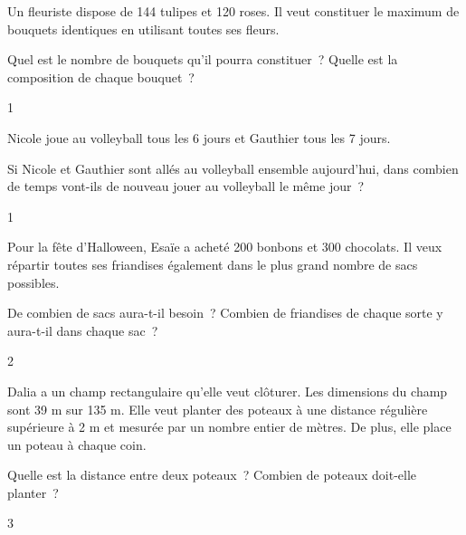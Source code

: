 \documentclass[a4paper,11pt]{report}
\begin{document}
\begin{exo}{ %
    Un fleuriste dispose de 144 tulipes et 120 roses. Il veut constituer le maximum de bouquets identiques en utilisant toutes ses fleurs.
    \begin{tasks}[label-width = 1em ,item-indent = 2em ,before-skip = -0.4em, after-skip = -0.4em , label-offset=0.666em,after-item-skip = 0.3em]
        \task Quel est le nombre de bouquets qu'il pourra constituer~?
        \task Quelle est la composition de chaque bouquet~?
    \end{tasks}
}{1}\end{exo}



\vfill


\begin{exo}{ %
    Nicole joue au volleyball tous les 6 jours et Gauthier tous les 7 jours. 

    Si Nicole et Gauthier sont allés au volleyball ensemble aujourd'hui, dans combien de temps vont-ils de nouveau jouer au volleyball le même jour~? 
}{1}\end{exo}

\vfill


\begin{exo}{ %
    Pour la fête d'Halloween, Esaïe a acheté 200 bonbons et 300 chocolats. Il veux répartir toutes ses friandises également dans le plus grand nombre de sacs possibles.
    \begin{tasks}[label-width = 1em ,item-indent = 2em ,before-skip = -0.4em, after-skip = -0.4em , label-offset=0.666em,after-item-skip = 0.3em]
        \task De combien de sacs aura-t-il besoin~?
        \task Combien de friandises de chaque sorte y aura-t-il dans chaque sac~?
    \end{tasks}
}{2}\end{exo}


\vfill
\begin{exo}{ %
    Dalia a un champ rectangulaire qu'elle veut clôturer. Les dimensions du champ sont 39 m sur 135 m. Elle veut planter des poteaux à une distance régulière supérieure à 2 m et mesurée par un nombre entier de mètres. De plus, elle place un poteau à chaque coin.
    \begin{tasks}[label-width = 1em ,item-indent = 2em ,before-skip = -0.4em, after-skip = -0.4em , label-offset=0.666em,after-item-skip = 0.3em]
        \task Quelle est la distance entre deux poteaux~?
        \task  Combien de poteaux doit-elle planter~?
    \end{tasks}

}{3}\end{exo}
\vfill
\end{document}
